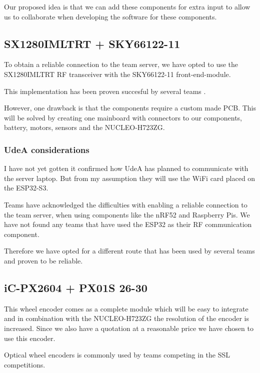\documentclass[a4paper,8pt]{article}
\begin{document}
  Our proposed idea is that we can add these components for extra input to allow us to collaborate when developing the software for these components. 

  \subsection{SX1280IMLTRT + SKY66122-11}

  To obtain a reliable connection to the team server, we have opted to
  use the SX1280IMLTRT RF transceiver with the SKY66122-11
  front-end-module.

  This implementation has been proven succesful by several teams \cite{ryllExtendedTeamDescription}\cite{barretoRoboIMEIgnitingInnovation}.

  However, one drawback is that the components require a custom made
  PCB. This will be solved by creating one mainboard with connectors to
  our components, battery, motors, sensors and the NUCLEO-H723ZG. 

  \subsubsection{UdeA considerations}

  I have not yet gotten it confirmed how UdeA has planned to communicate with the server laptop. But from my assumption they will use the WiFi card placed on the ESP32-S3. 

  Teams have acknowledged the difficulties with enabling a reliable connection to the team server, when using components like the nRF52 and Raspberry Pis. We have not found any teams that have used the ESP32 as their RF communication component.

  Therefore we have opted for a different route that has been used by several teams and proven to be reliable. \cite{ryllExtendedTeamDescription2020}

  \subsection{iC-PX2604 + PX01S 26-30}

  This wheel encoder comes as a complete module which will be easy to
  integrate and in combination with the NUCLEO-H723ZG the resolution of
  the encoder is increased. Since we also have a quotation at a
  reasonable price we have chosen to use this encoder.

  Optical wheel encoders is commonly used by teams competing in the SSL competitions.
\end{document}
